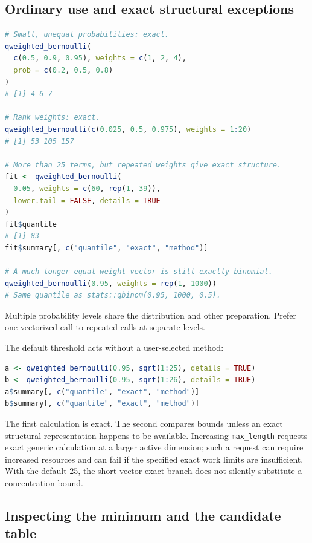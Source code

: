 \documentclass[11pt,letterpaper]{article}
\numberwithin{equation}{section}
\theoremstyle{definition}
\theoremstyle{remark}
\begin{document}
\subsection{Ordinary use and exact structural exceptions}

\begin{lstlisting}[language=R]
# Small, unequal probabilities: exact.
qweighted_bernoulli(
  c(0.5, 0.9, 0.95), weights = c(1, 2, 4),
  prob = c(0.2, 0.5, 0.8)
)
# [1] 4 6 7

# Rank weights: exact.
qweighted_bernoulli(c(0.025, 0.5, 0.975), weights = 1:20)
# [1] 53 105 157

# More than 25 terms, but repeated weights give exact structure.
fit <- qweighted_bernoulli(
  0.05, weights = c(60, rep(1, 39)),
  lower.tail = FALSE, details = TRUE
)
fit$quantile
# [1] 83
fit$summary[, c("quantile", "exact", "method")]

# A much longer equal-weight vector is still exactly binomial.
qweighted_bernoulli(0.95, weights = rep(1, 1000))
# Same quantile as stats::qbinom(0.95, 1000, 0.5).
\end{lstlisting}
Multiple probability levels share the distribution and other preparation.
Prefer one vectorized call to repeated calls at separate levels.

The default threshold acts without a user-selected method:
\begin{lstlisting}[language=R]
a <- qweighted_bernoulli(0.95, sqrt(1:25), details = TRUE)
b <- qweighted_bernoulli(0.95, sqrt(1:26), details = TRUE)
a$summary[, c("quantile", "exact", "method")]
b$summary[, c("quantile", "exact", "method")]
\end{lstlisting}
The first calculation is exact. The second compares bounds unless an exact
structural representation happens to be available. Increasing
\texttt{max\_length} requests exact generic calculation at a larger active
dimension; such a request can require increased resources and can fail if
the specified exact work limits are insufficient. With the default 25,
the short-vector exact branch does not silently substitute a concentration
bound.

\subsection{Inspecting the minimum and the candidate table}
\end{document}
